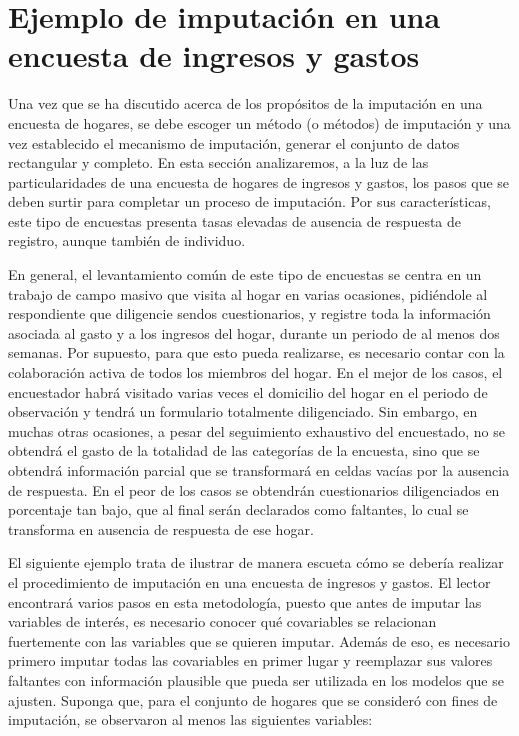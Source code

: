 \documentclass[
  12pt,
]{book}
\begin{document}
\hypertarget{ejemplo-de-imputaciuxf3n-en-una-encuesta-de-ingresos-y-gastos}{%
\section{Ejemplo de imputación en una encuesta de ingresos y gastos}\label{ejemplo-de-imputaciuxf3n-en-una-encuesta-de-ingresos-y-gastos}}

Una vez que se ha discutido acerca de los propósitos de la imputación en una encuesta de hogares, se debe escoger un método (o métodos) de imputación y una vez establecido el mecanismo de imputación, generar el conjunto de datos rectangular y completo. En esta sección analizaremos, a la luz de las particularidades de una encuesta de hogares de ingresos y gastos, los pasos que se deben surtir para completar un proceso de imputación. Por sus características, este tipo de encuestas presenta tasas elevadas de ausencia de respuesta de registro, aunque también de individuo.

En general, el levantamiento común de este tipo de encuestas se centra en un trabajo de campo masivo que visita al hogar en varias ocasiones, pidiéndole al respondiente que diligencie sendos cuestionarios, y registre toda la información asociada al gasto y a los ingresos del hogar, durante un periodo de al menos dos semanas. Por supuesto, para que esto pueda realizarse, es necesario contar con la colaboración activa de todos los miembros del hogar. En el mejor de los casos, el encuestador habrá visitado varias veces el domicilio del hogar en el periodo de observación y tendrá un formulario totalmente diligenciado. Sin embargo, en muchas otras ocasiones, a pesar del seguimiento exhaustivo del encuestado, no se obtendrá el gasto de la totalidad de las categorías de la encuesta, sino que se obtendrá información parcial que se transformará en celdas vacías por la ausencia de respuesta. En el peor de los casos se obtendrán cuestionarios diligenciados en porcentaje tan bajo, que al final serán declarados como faltantes, lo cual se transforma en ausencia de respuesta de ese hogar.

El siguiente ejemplo trata de ilustrar de manera escueta cómo se debería realizar el procedimiento de imputación en una encuesta de ingresos y gastos. El lector encontrará varios pasos en esta metodología, puesto que antes de imputar las variables de interés, es necesario conocer qué covariables se relacionan fuertemente con las variables que se quieren imputar. Además de eso, es necesario primero imputar todas las covariables en primer lugar y reemplazar sus valores faltantes con información plausible que pueda ser utilizada en los modelos que se ajusten. Suponga que, para el conjunto de hogares que se consideró con fines de imputación, se observaron al menos las siguientes variables:
\end{document}
